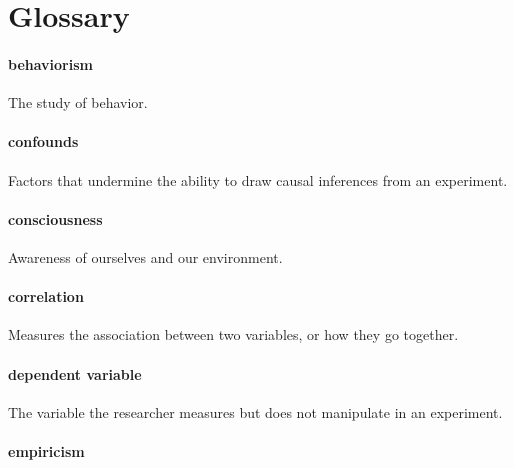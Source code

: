 \documentclass[
]{krantz}
\begin{document}
\hypertarget{glossary}{%
\section{Glossary}\label{glossary}}

\hypertarget{behaviorism}{%
\paragraph*{behaviorism}\label{behaviorism}}

The study of behavior.

\hypertarget{confounds}{%
\paragraph*{confounds}\label{confounds}}

Factors that undermine the ability to draw causal inferences from an experiment.

\hypertarget{consciousness}{%
\paragraph*{consciousness}\label{consciousness}}

Awareness of ourselves and our environment.

\hypertarget{correlation}{%
\paragraph*{correlation}\label{correlation}}

Measures the association between two variables, or how they go together.

\hypertarget{dependent-variable}{%
\paragraph*{dependent variable}\label{dependent-variable}}

The variable the researcher measures but does not manipulate in an experiment.

\hypertarget{empiricism}{%
\paragraph*{empiricism}\label{empiricism}}
\end{document}
